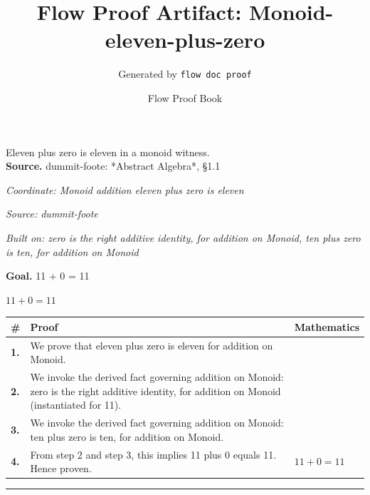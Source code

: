 \documentclass[11pt]{article}
\title{Flow Proof Artifact: Monoid-eleven-plus-zero}
\author{Generated by \texttt{flow doc proof}}
\date{Flow Proof Book}
\theoremstyle{definition}
\begin{document}
\maketitle
Eleven plus zero is eleven in a monoid witness.\\[0.5em]
\textbf{Source.} dummit-foote: *Abstract Algebra*, §1.1\\[0.5em]
\bigskip
{}\par
\smallskip\noindent\textit{Coordinate: Monoid \cdot addition \cdot eleven plus zero is eleven}\par
\smallskip\noindent\textit{Source: dummit-foote}\par
\smallskip\noindent\textit{Built on: zero is the right additive identity, for addition on Monoid, ten plus zero is ten, for addition on Monoid}\par
\medskip
\noindent\textbf{Goal.} 11 + 0 = 11\par
\noindent$\displaystyle 11 + 0 = 11$\par
\medskip
\noindent
\begin{tabular}{@{} >{\raggedright\arraybackslash}p{} >{\raggedright\arraybackslash}p{} >{\raggedleft\arraybackslash}p{} @{}}
\textbf{\#} & \textbf{Proof} & \textbf{Mathematics} \\
\midrule
\textbf{1.} & We prove that eleven plus zero is eleven for addition on Monoid. & \\[0.45em]
\textbf{2.} & We invoke the derived fact governing addition on Monoid: zero is the right additive identity, for addition on Monoid (instantiated for 11). & \\[0.45em]
\textbf{3.} & We invoke the derived fact governing addition on Monoid: ten plus zero is ten, for addition on Monoid. & \\[0.45em]
\textbf{4.} & From step 2 and step 3, this implies 11 plus 0 equals 11. Hence proven. & $\displaystyle 11 + 0 = 11$ \\[0.45em]
\bottomrule
\end{tabular}
\label{thm:Monoid-addition-eleven_plus_zero_is_eleven}
\par\medskip\hrule
\end{document}
